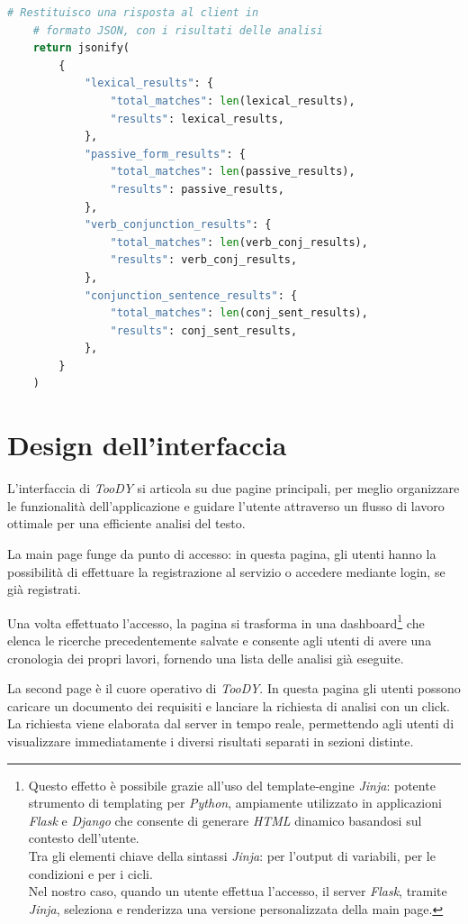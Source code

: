 \documentclass[12pt]{report}
\newcommand{\toody}{\textsl{TooDY}\xspace}
\newcommand{\python}{\textsl{Python}\xspace}
\newcommand{\jinja}{\textsl{Jinja}\xspace}
\newcommand{\flask}{\textsl{Flask}\xspace}
\newcommand{\django}{\textsl{Django}\xspace}
\newcommand{\html}{\textsl{HTML}\xspace}
\begin{document}
\begin{lstlisting}[language=Python]
    # Restituisco una risposta al client in
    # formato JSON, con i risultati delle analisi
    return jsonify(
        {
            "lexical_results": {
                "total_matches": len(lexical_results),
                "results": lexical_results,
            },
            "passive_form_results": {
                "total_matches": len(passive_results),
                "results": passive_results,
            },
            "verb_conjunction_results": {
                "total_matches": len(verb_conj_results),
                "results": verb_conj_results,
            },
            "conjunction_sentence_results": {
                "total_matches": len(conj_sent_results),
                "results": conj_sent_results,
            },
        }
    )
\end{lstlisting}


\section{Design dell'interfaccia}
L'interfaccia di \toody si articola su due pagine principali, per meglio organizzare le funzionalità dell'applicazione e guidare l'utente attraverso un flusso di lavoro ottimale per una efficiente analisi del testo.

La \textsf{main page} funge da punto di accesso: in questa pagina, gli utenti hanno la possibilità di effettuare la registrazione al servizio o accedere mediante login, se già registrati.

Una volta effettuato l'accesso, la pagina si trasforma in una dashboard\footnote{Questo effetto è possibile grazie all'uso del template-engine \jinja: potente strumento di templating per \python, ampiamente utilizzato in applicazioni \flask e \django che consente di generare \html dinamico basandosi sul contesto dell'utente.\\
Tra gli elementi chiave della sintassi \jinja: \texttt{\string{\string{ \string}\string}} per l'output di variabili, \texttt{} per le condizioni e \texttt{} per i cicli.\\
Nel nostro caso, quando un utente effettua l'accesso, il server \flask, tramite \jinja, seleziona e renderizza una versione personalizzata della main page.} che elenca le ricerche precedentemente salvate e consente agli utenti di avere una cronologia dei propri lavori, fornendo una lista delle analisi già eseguite.

La \textsf{second page} è il cuore operativo di \toody. In questa pagina gli utenti possono caricare un documento dei requisiti e lanciare la richiesta di analisi con un click. La richiesta viene elaborata dal server in tempo reale, permettendo agli utenti di visualizzare immediatamente i diversi risultati separati in sezioni distinte.
\end{document}
